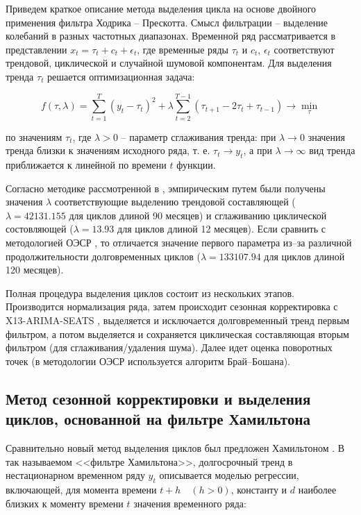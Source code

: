 \documentclass[a4paper,14pt]{extreport}
\begin{document}
	Приведем краткое описание метода выделения цикла на основе двойного применения фильтра Ходрика – Прескотта. Смысл фильтрации – выделение колебаний в разных частотных диапазонах. Временной ряд рассматривается в представлении $ x_{t} = \tau_{t} + c_{t} + \epsilon_{t}$, где временные ряды $\tau_{t}$ и $c_{t}$, $\epsilon_{t}$ соответствуют трендовой, циклической и случайной шумовой компонентам. Для выделения тренда $\tau_{t}$ решается оптимизационная задача:
	
	\begin{equation} 
	f(\tau, \lambda) = \sum_{t=1}^{T} (y_t-\tau_{t})^2 + \lambda \sum_{t=2}^{T-1} (\tau_{t+1} - 2\tau_{t} + \tau_{t-1}) \rightarrow \min_{\tau} 
	\end{equation}
	
	по значениям $\tau_{t}$, где $\lambda > 0$ – параметр сглаживания тренда: при $\lambda \rightarrow 0$  значения тренда близки к значениям исходного ряда, т. е.  $\tau_{t} \rightarrow y_{t}$, а при $\lambda \rightarrow \infty$ вид тренда приближается  к линейной по времени $t$  функции.
	
	Согласно методике рассмотренной в \cite{esiMaking,esiExtra}, эмпирическим путем были получены значения $\lambda$ соответствующие выделению трендовой составляющей ($\lambda=42131.155$ для циклов длиной 90 месяцев) и сглаживанию циклической состовляющей ($\lambda=13.93$ для циклов длиной 12 месяцев). Если сравнить с методологией ОЭСР \cite{oecdCycleExtraction}, то отличается значение первого параметра из–за различной продолжительности долговременных циклов ($\lambda=133107.94$ для циклов длиной 120 месяцев).
	
	Полная процедура выделения циклов состоит из нескольких этапов. Производится нормализация ряда, затем происходит сезонная корректировка с X13-ARIMA-SEATS \cite{seasonalManual}, выделяется и исключается долговременный тренд первым фильтром, а потом выделяется и сохраняется циклическая составляющая вторым фильтром (для сглаживания/удаления шума). Далее идет оценка поворотных точек (в методологии ОЭСР \cite{oecdCycleExtraction} используется алгоритм Брай–Бошана).
	
	\subsection{Метод сезонной корректировки и выделения циклов, основанной на фильтре Хамильтона}
	
	Сравнительно новый метод выделения циклов был предложен Хамильтоном \cite{hamNewApproach}. В так называемом <<фильтре Хамильтона>>, долгосрочный тренд в нестационарном временном ряду $y_t$  описывается моделью регрессии, включающей, для момента времени  $t+h \quad (h>0)$, константу и $d$ наиболее близких к моменту времени $t$ значения временного ряда:
	
\end{document}

